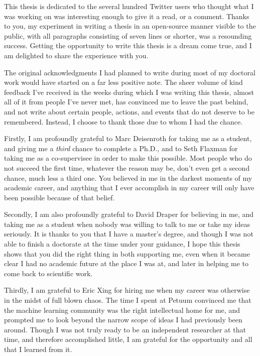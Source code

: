 \documentclass[11pt]{book}
\begin{document}
This thesis is dedicated to the several hundred Twitter users who thought what I was working on was interesting enough to give it a read, or a comment.
Thanks to you, my experiment in writing a thesis in an open-source manner visible to the public, with all paragraphs consisting of seven lines or shorter, was a resounding success.
Getting the opportunity to write this thesis is a dream come true, and I am delighted to share the experience with you.

The original acknowledgments I had planned to write during most of my doctoral work would have started on a far less positive note.
The sheer volume of kind feedback I've received in the weeks during which I was writing this thesis, almost all of it from people I've never met, has convinced me to leave the past behind, and not write about certain people, actions, and events that do not deserve to be remembered.
Instead, I choose to thank those due to whom I had the chance.

Firstly, I am profoundly grateful to Marc Deisenroth for taking me as a student, and giving me a \emph{third} chance to complete a Ph.D., and to Seth Flaxman for taking me as a co-supervisee in order to make this possible.
Most people who do not succeed the first time, whatever the reason may be, don't even get a second chance, much less a third one.
You believed in me in the darkest moments of my academic career, and anything that I ever accomplish in my career will only have been possible because of that belief.

Secondly, I am also profoundly grateful to David Draper for believing in me, and taking me as a student when nobody 
was willing to talk to me or take my ideas seriously.
It is thanks to you that I have a master's degree, and though I was not able to finish a doctorate at the time under your guidance, I hope this thesis shows that you did the right thing in both supporting me, even when it became clear I had no academic future at the place I was at, and later in helping me to come back to scientific work.

Thirdly, I am grateful to Eric Xing  for hiring me when my career was otherwise in the midst of full blown chaos.
The time I spent at Petuum convinced me that the machine learning community was the right intellectual home for me, and prompted me to look beyond the narrow scope of ideas I had previously been around.
Though I was not truly ready to be an independent researcher at that time, and therefore accomplished little, I am grateful for the opportunity and all that I learned from it.
\end{document}
